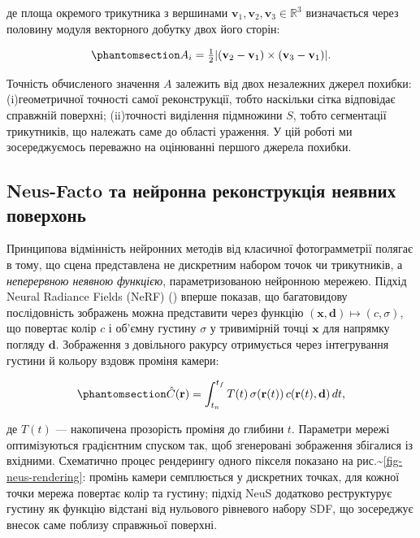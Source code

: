 \documentclass[
  ukrainian,
  10pt,
  a4paper,
  twocolumn]{article}
\begin{document}
де площа окремого трикутника з вершинами
\(\mathbf{v}_1, \mathbf{v}_2, \mathbf{v}_3 \in \mathbb{R}^3\)
визначається через половину модуля векторного добутку двох його сторін:

\begin{equation}\protect\phantomsection\label{eq-triangle-area}{
A_i = \tfrac{1}{2} \lvert (\mathbf{v}_2 - \mathbf{v}_1) \times (\mathbf{v}_3 - \mathbf{v}_1) \rvert.
}\end{equation}

Точність обчисленого значення \(A\) залежить від двох незалежних джерел
похибки: (i)геометричної точності самої реконструкції, тобто наскільки
сітка відповідає справжній поверхні; (ii)точності виділення підмножини
\(S\), тобто сегментації трикутників, що належать саме до області
ураження. У цій роботі ми зосереджуємось переважно на оцінюванні першого
джерела похибки.

\subsection{Neus-Facto та нейронна реконструкція неявних
поверхонь}\label{neus-facto-ux442ux430-ux43dux435ux439ux440ux43eux43dux43dux430-ux440ux435ux43aux43eux43dux441ux442ux440ux443ux43aux446ux456ux44f-ux43dux435ux44fux432ux43dux438ux445-ux43fux43eux432ux435ux440ux445ux43eux43dux44c}

Принципова відмінність нейронних методів від класичної фотограмметрії
полягає в тому, що сцена представлена не дискретним набором точок чи
трикутників, а \emph{неперервною неявною функцією}, параметризованою
нейронною мережею. Підхід Neural Radiance Fields (NeRF)
() вперше
показав, що багатовидову послідовність зображень можна представити через
функцію \((\mathbf{x}, \mathbf{d}) \mapsto (c, \sigma)\), що повертає
колір \(c\) і об'ємну густину \(\sigma\) у тривимірній точці
\(\mathbf{x}\) для напрямку погляду \(\mathbf{d}\). Зображення з
довільного ракурсу отримується через інтегрування густини й кольору
вздовж проміня камери:

\begin{equation}\protect\phantomsection\label{eq-volumetric-rendering}{
\hat{C}(\mathbf{r}) = \int_{t_n}^{t_f} T(t) \, \sigma(\mathbf{r}(t)) \, c(\mathbf{r}(t), \mathbf{d}) \, dt,
}\end{equation}

де \(T(t)\) --- накопичена прозорість проміня до глибини \(t\).
Параметри мережі оптимізуються градієнтним спуском так, щоб згенеровані
зображення збігалися із вхідними. Схематично процес рендерингу одного
пікселя показано на рис.\textasciitilde{}\ref{fig-neus-rendering}:
промінь камери семплюється у дискретних точках, для кожної точки мережа
повертає колір та густину; підхід NeuS додатково реструктурує густину як
функцію відстані від нульового рівневого набору SDF, що зосереджує
внесок саме поблизу справжньої поверхні.
\end{document}
